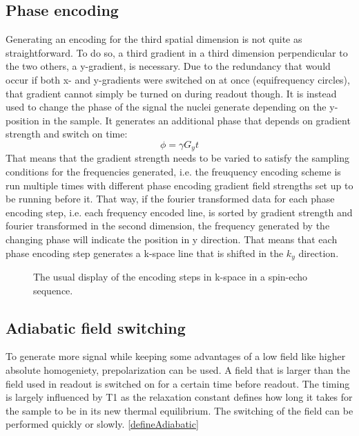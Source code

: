         \subsection{Phase encoding}
            Generating an encoding for the third spatial dimension is not quite as straightforward.  To do so, a third gradient in a third dimension perpendicular to the two others, a y-gradient, is necessary.  Due to the redundancy that would occur if both x- and y-gradients were switched on at once (equifrequency circles), that gradient cannot simply be turned on during readout though.  It is instead used to change the phase of the signal the nuclei generate depending on the y-position in the sample. It generates an additional phase that depends on gradient strength and switch on time:
            \begin{equation}
                \phi = \gamma G_y t
            \end{equation}
            That means that the gradient strength needs to be varied to satisfy the sampling conditions for the frequencies generated, i.e. the freuquency encoding scheme is run multiple times with different phase encoding gradient field strengths set up to be running before it. That way, if the fourier transformed data for each phase encoding step, i.e. each frequency encoded line, is sorted by gradient strength and fourier transformed in the second dimension, the frequency generated by the changing phase will indicate the position in y direction. That means that each phase encoding step generates a k-space line that is shifted in the $k_y$ direction.
            \begin{figure}
                \caption[k-space Graph]{The usual display of the encoding steps in k-space in a spin-echo sequence.}
            \end{figure}

        \subsection{Adiabatic field switching}
            To generate more signal while keeping some advantages of a low field like higher absolute homogeniety, prepolarization can be used. A field that is larger than the field used in readout is switched on for a certain time before readout. The timing is largely influenced by T1 as the relaxation constant defines how long it takes for the sample to be in its new thermal equilibrium. The switching of the field can be performed quickly or slowly. \ref{defineAdiabatic}
